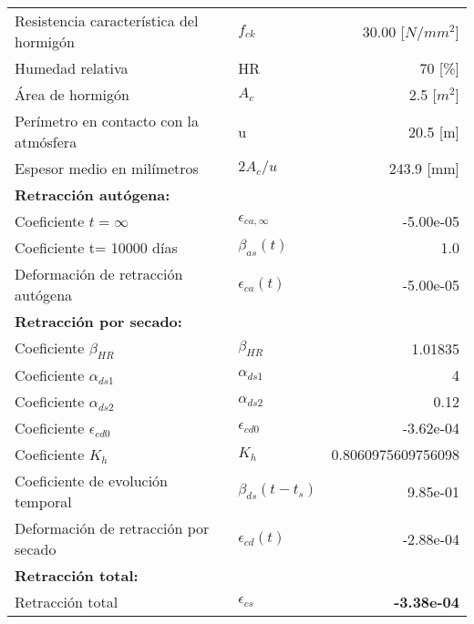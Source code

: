 \documentclass[12pt,spanish,a4paper]{article}
\begin{document}
 
\begin{center}
\begin{tabular}{llr}
Resistencia característica del hormigón & $ f_{ck}$ &  30.00 [$N/mm^2$] \\
Humedad relativa & HR & 70 [\%] \\
Área de hormigón & $A_c$ & 2.5 [$m^2$] \\
Perímetro en contacto con la atmósfera & u & 20.5 [m] \\
Espesor medio en milímetros & $2A_c/u$ & 243.9 [mm] \\
\multicolumn{3}{l}{\textbf{Retracción autógena:}} \\
Coeficiente $t=\infty$ & $\epsilon_{ca,\infty}$ & -5.00e-05 \\
Coeficiente t= 10000 días & $\beta_{as}(t)$ & 1.0 \\
Deformación de retracción autógena & $\epsilon_{ca}(t)$ & -5.00e-05 \\
\multicolumn{3}{l}{\textbf{Retracción por secado: }} \\
Coeficiente $\beta_{HR}$ & $\beta_{HR}$ & 1.01835 \\
Coeficiente $\alpha_{ds1}$ & $\alpha_{ds1}$ & 4 \\
Coeficiente $\alpha_{ds2}$ & $\alpha_{ds2}$ & 0.12 \\
Coeficiente $\epsilon_{cd0}$ & $\epsilon_{cd0}$ & -3.62e-04 \\
Coeficiente $K_{h}$ & $K_{h}$ & 0.8060975609756098 \\
Coeficiente de evolución temporal & $\beta_{ds}(t-t_s)$ & 9.85e-01 \\
Deformación de retracción por secado & $\epsilon_{cd}(t)$ & -2.88e-04 \\
\multicolumn{3}{l}{\textbf{Retracción total:}} \\
Retracción total & $\epsilon_{cs}$ & \textbf{-3.38e-04} \\
\end{tabular}
\end{center}
\end{document}
